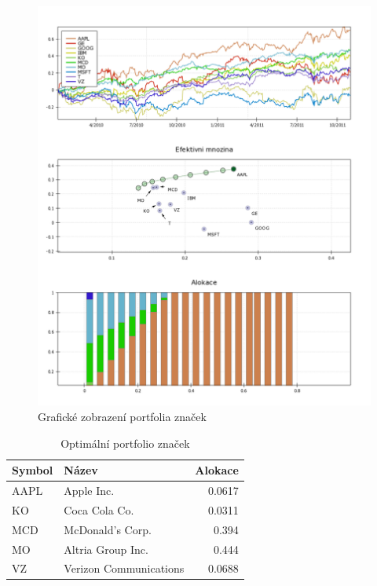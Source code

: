 \documentclass[a4paper,12pt]{report}
\begin{document}
    \begin{figure}[htb]
      \centering
        \includegraphics[height=0.95\textheight]{brands1.png}
       \caption{Grafické zobrazení portfolia značek}
    \end{figure}

    \begin{table}[htb]
      \centering
      \begin{tabular}{|l|l|r|}
        \hline
        Symbol&Název&Alokace\\\hline\hline
        AAPL&Apple Inc. &0.0617\\\hline
        KO&Coca Cola Co. &0.0311\\\hline
        MCD&McDonald's Corp. &0.394\\\hline
        MO&Altria Group Inc. &0.444\\\hline
        VZ&Verizon Communications &0.0688\\\hline
      \end{tabular}
      \caption{Optimální portfolio značek}
    \end{table}
    
\end{document}
